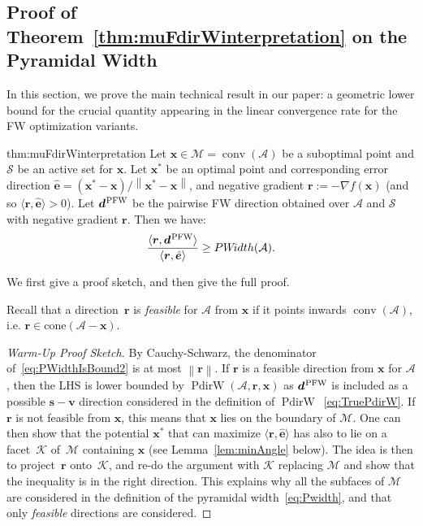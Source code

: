 \documentclass{article} %
\DeclareMathOperator*{\conv}{conv}
\providecommand{\norm}[1]{\left\lVert#1\right\rVert}
\newcommand{\domain}{\mathcal{M}} %
\newcommand{\PFW}{{\hspace{0.05em}\textnormal{PFW}}}
\newcommand{\x}{\bm{x}}
\newcommand{\s}{\bm{s}}
\newcommand{\dd}{\bm{d}}
\newcommand{\vv}{\bm{v}} %
\newcommand{\Vertices}{\mathcal{A}} %
\renewcommand{\S}{\mathcal{S}}
\renewcommand{\r}{\bm{r}}
\newcommand{\PdirW}{\mathop{PdirW}}
\newcommand{\PWidth}{\mathop{PW\!idth}}
\newcommand{\innerProdCompressed}[2]{\langle #1 , #2 \rangle}
\newcommand{\Kface}{\mathcal{K}}
\newcommand{\err}{\bm{e}} %
\newcommand{\0}{\mathbf{0}} %
\begin{document}
%
\subsection{Proof of Theorem~\ref{thm:muFdirWinterpretation} on the Pyramidal Width} \label{app:ProofWidth} 

In this section, we prove the main technical result in our paper: a geometric lower bound
for the crucial quantity appearing in the linear convergence rate for the FW 
optimization variants.

\begin{reptheorem}{thm:muFdirWinterpretation}
Let $\x \in \domain=\conv(\Vertices)$ be a suboptimal point and $\S$ be an
active set for $\x$. Let $\x^*$ be an optimal point and corresponding error
direction $\hat{\err} = (\x^*-\x)/\norm{\x^*-\x}$, and negative gradient $\r
:= -\nabla f(\x)$  (and so $\innerProdCompressed{\r}{\hat{\err}} > 0$). Let
$\dd^\PFW$ be the pairwise FW direction obtained over $\Vertices$ and $\S$ with negative
gradient $\r$. Then we have:
\begin{equation} \label{eq:PWidthIsBound2}
\frac{\innerProdCompressed{\r}{\dd^\PFW}}{\innerProdCompressed{\r}{\hat{\err}}}
\geq \PWidth(\Vertices) .
\end{equation}   
\end{reptheorem}

We first give a proof sketch, and then give the full proof.

Recall that a direction~$\r$ is \emph{feasible} for $\Vertices$ from $\x$ if it points inwards $\conv(\Vertices)$, 
%
i.e. $\r \in \text{cone}(\Vertices-\x)$.

\begin{proof}[Warm-Up Proof Sketch]
By Cauchy-Schwarz, the denominator of~\eqref{eq:PWidthIsBound2} is at most
$\norm{\r}$. If $\r$ is a feasible direction from $\x$ for $\Vertices$, then the LHS is lower bounded by $\PdirW(\Vertices, \r,
\x)$ as $\dd^\PFW$ is included as a possible $\s - \vv$ direction considered in the definition of $\PdirW$~\eqref{eq:TruePdirW}.
If $\r$ is not feasible from $\x$, this means that
$\x$ lies on the boundary of $\domain$. One can then show that the
potential $\x^*$ that can maximize $\innerProdCompressed{\r}{\hat{\err}}$ has
also to lie on a facet~$\Kface$ of~$\domain$ containing $\x$ (see Lemma~\ref{lem:minAngle} below). 
The idea is then to
project~$\r$ onto~$\Kface$, and re-do the argument with $\Kface$ replacing
$\domain$ and show that the inequality is in the right direction. This
explains why all the subfaces of $\domain$ are considered in the definition of
the pyramidal width~\eqref{eq:Pwidth}, and that only \emph{feasible}
directions are considered.
%
\end{proof}
\end{document}
